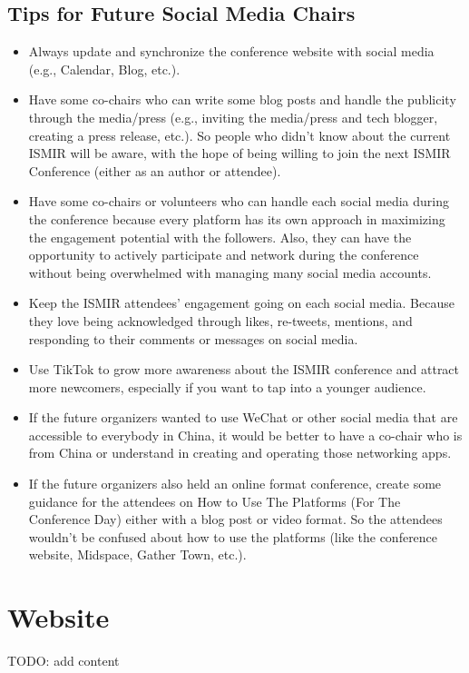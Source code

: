\documentclass[%
10pt,								%
]
{scrartcl}
\begin{document}
    \subsection{Tips for Future Social Media Chairs}
        \begin{itemize}
            \item   Always update and synchronize the conference website with social media (e.g., Calendar, Blog, etc.).
            \item   Have some co-chairs who can write some blog posts and handle the publicity through the media/press (e.g., inviting the media/press and tech blogger, creating a press release, etc.). So people who didn’t know about the current ISMIR will be aware, with the hope of being willing to join the next ISMIR Conference (either as an author or attendee).
            \item   Have some co-chairs or volunteers who can handle each social media during the conference because every platform has its own approach in maximizing the engagement potential with the followers. Also, they can have the opportunity to actively participate and network during the conference without being overwhelmed with managing many social media accounts.
            \item   Keep the ISMIR attendees' engagement going on each social media. Because they love being acknowledged through likes, re-tweets, mentions, and responding to their comments or messages on social media.
            \item   Use TikTok to grow more awareness about the ISMIR conference and attract more newcomers, especially if you want to tap into a younger audience.
            \item   If the future organizers wanted to use WeChat or other social media that are accessible to everybody in China, it would be better to have a co-chair who is from China or understand in creating and operating those networking apps.
            \item   If the future organizers also held an online format conference, create some guidance for the attendees on How to Use The Platforms (For The Conference Day) either with a blog post or video format. So the attendees wouldn't be confused about how to use the platforms (like the conference website, Midspace, Gather Town, etc.).

        \end{itemize}

\section{Website}
    TODO: add content
    
\end{document}
